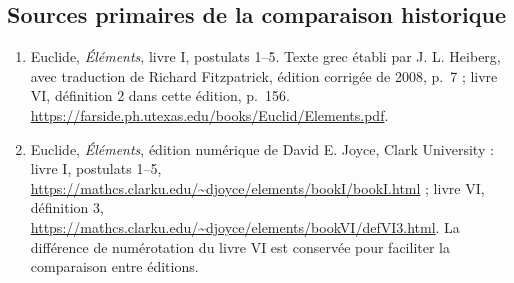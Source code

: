 \subsection*{Sources primaires de la comparaison historique
}

\begin{enumerate}[label=\arabic*.]

 \item Euclide, \emph{Éléments}, livre I, postulats 1--5. Texte
 grec établi par J. L. Heiberg, avec traduction de Richard Fitzpatrick,
 édition corrigée de 2008, p.~7 ; livre VI, définition 2 dans cette édition,
 p.~156. \url{https://farside.ph.utexas.edu/books/Euclid/Elements.pdf}.

 \item Euclide, \emph{Éléments}, édition numérique de David E. Joyce,
 Clark University : livre I, postulats 1--5,
 \url{https://mathcs.clarku.edu/~djoyce/elements/bookI/bookI.html} ;
 livre VI, définition 3,
 \url{https://mathcs.clarku.edu/~djoyce/elements/bookVI/defVI3.html}.
 La différence de numérotation du livre VI est conservée pour faciliter la comparaison entre éditions.
\end{enumerate}

